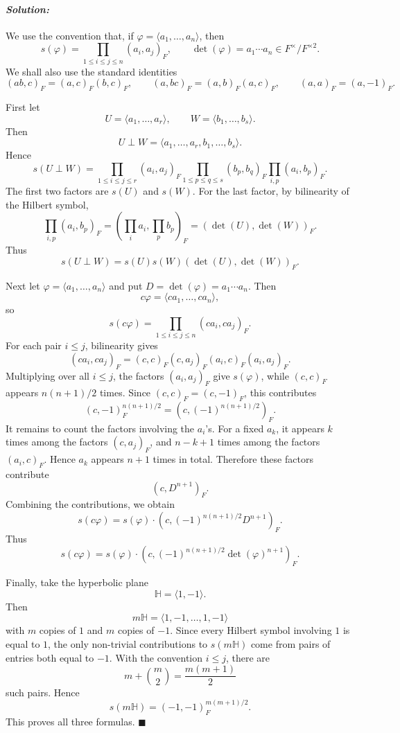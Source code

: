 \documentclass[12pt, a4paper]{article}
\newenvironment{solution}
  {\paragraph{\textit{Solution:}}\par\medskip}
  {\hfill$\blacksquare$\vspace{0.1cm}}
\begin{document}
\begin{solution}
We use the convention that, if
\(\varphi=\langle a_1,\dots,a_n\rangle\), then
\[
s(\varphi)=\prod_{1\le i\le j\le n}(a_i,a_j)_F,
\qquad
\det(\varphi)=a_1\cdots a_n\in F^\times/F^{\times 2}.
\]
We shall also use the standard identities
\[
(ab,c)_F=(a,c)_F(b,c)_F,\qquad
(a,bc)_F=(a,b)_F(a,c)_F,\qquad
(a,a)_F=(a,-1)_F.
\]

First let
\[
U=\langle a_1,\dots,a_r\rangle,\qquad
W=\langle b_1,\dots,b_s\rangle.
\]
Then
\[
U\perp W=\langle a_1,\dots,a_r,b_1,\dots,b_s\rangle.
\]
Hence
\[
s(U\perp W)
=
\prod_{1\le i\le j\le r}(a_i,a_j)_F
\prod_{1\le p\le q\le s}(b_p,b_q)_F
\prod_{i,p}(a_i,b_p)_F.
\]
The first two factors are \(s(U)\) and \(s(W)\). For the last factor, by
bilinearity of the Hilbert symbol,
\[
\prod_{i,p}(a_i,b_p)_F
=
\left(\prod_i a_i,\prod_p b_p\right)_F
=
(\det(U),\det(W))_F.
\]
Thus
\[
s(U\perp W)
=
s(U)s(W)(\det(U),\det(W))_F.
\]

Next let \(\varphi=\langle a_1,\dots,a_n\rangle\) and put
\(D=\det(\varphi)=a_1\cdots a_n\). Then
\[
c\varphi=\langle ca_1,\dots,ca_n\rangle,
\]
so
\[
s(c\varphi)=\prod_{1\le i\le j\le n}(ca_i,ca_j)_F.
\]
For each pair \(i\le j\), bilinearity gives
\[
(ca_i,ca_j)_F
=
(c,c)_F(c,a_j)_F(a_i,c)_F(a_i,a_j)_F.
\]
Multiplying over all \(i\le j\), the factors \((a_i,a_j)_F\) give
\(s(\varphi)\), while \((c,c)_F\) appears \(n(n+1)/2\) times. Since
\((c,c)_F=(c,-1)_F\), this contributes
\[
(c,-1)_F^{n(n+1)/2}
=
\left(c,(-1)^{n(n+1)/2}\right)_F.
\]
It remains to count the factors involving the \(a_i\)'s. For a fixed \(a_k\),
it appears \(k\) times among the factors \((c,a_j)_F\), and \(n-k+1\) times
among the factors \((a_i,c)_F\). Hence \(a_k\) appears \(n+1\) times in total.
Therefore these factors contribute
\[
(c,D^{n+1})_F.
\]
Combining the contributions, we obtain
\[
s(c\varphi)
=
s(\varphi)\cdot
\left(c,(-1)^{n(n+1)/2}D^{n+1}\right)_F.
\]
Thus
\[
s(c\varphi)
=
s(\varphi)\cdot
\left(c,(-1)^{n(n+1)/2}\det(\varphi)^{n+1}\right)_F.
\]

Finally, take the hyperbolic plane
\[
\mathbb H=\langle 1,-1\rangle.
\]
Then
\[
m\mathbb H
=
\langle 1,-1,\dots,1,-1\rangle
\]
with \(m\) copies of \(1\) and \(m\) copies of \(-1\). Since every Hilbert
symbol involving \(1\) is equal to \(1\), the only non-trivial contributions
to \(s(m\mathbb H)\) come from pairs of entries both equal to \(-1\). With the
convention \(i\le j\), there are
\[
m+\binom m2=\frac{m(m+1)}2
\]
such pairs. Hence
\[
s(m\mathbb H)
=
(-1,-1)_F^{m(m+1)/2}.
\]
This proves all three formulas.
\end{solution}
\end{document}
